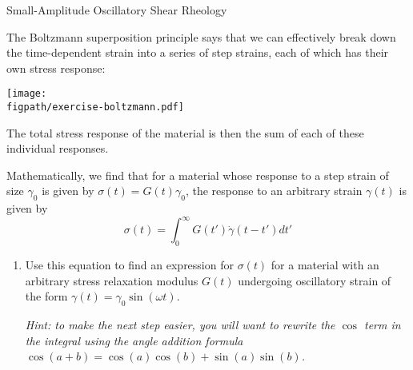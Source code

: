 \begin{activity}[extension]{Small-Amplitude Oscillatory Shear Rheology}
\begin{exercises}
			The Boltzmann superposition principle says that we can effectively break down the time-dependent strain into a series of step strains, each of which has their own stress response:
				
		\centerline{\texttt{[image: \\figpath/exercise-boltzmann.pdf]}}
			
			The total stress response of the material is then the sum of each of these individual responses.
			
			Mathematically, we find that for a material whose response to a step strain of size $\gamma_0$ is given by $\sigma(t) = G(t)\gamma_0$, the response to an arbitrary strain $\gamma(t)$ is given by
			\begin{equation*}
				\sigma(t) = \int_0^{\infty} G(t') \dot\gamma(t-t') dt'
			\end{equation*}
		
			\begin{enumerate}
			
				\item Use this equation to find an expression for $\sigma(t)$ for a material with an arbitrary stress relaxation modulus $G(t)$ undergoing oscillatory strain of the form $\gamma(t) = \gamma_0 \sin(\omega t)$.
				
					\emph{Hint: to make the next step easier, you will want to rewrite the $\cos$ term in the integral using the angle addition formula $\cos(a+b) = \cos(a)\cos(b) + \sin(a)\sin(b)$.}
				
					\begin{solution}
\end{solution}
\end{enumerate}
\end{exercises}
\end{activity}
